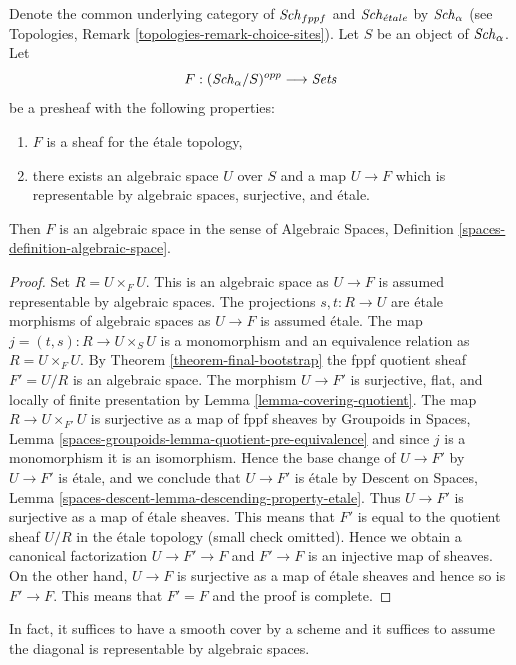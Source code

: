 \begin{lemma}
\label{lemma-spaces-etale-locally-representable}
Denote the common underlying category of $\mathit{Sch}_{fppf}$ and $\mathit{Sch}_{\acute{e}tale}$ by
$\mathit{Sch}_\alpha$ (see Topologies, Remark \ref{topologies-remark-choice-sites}).
Let $S$ be an object of $\mathit{Sch}_\alpha$. Let
$$
F : (\mathit{Sch}_\alpha/S)^{opp} \longrightarrow \textit{Sets}
$$
be a presheaf with the following properties:
\begin{enumerate}
\item $F$ is a sheaf for the \'etale topology,
\item there exists an algebraic space $U$ over $S$
and a map $U \to F$ which is representable by
algebraic spaces, surjective, and \'etale.
\end{enumerate}
Then $F$ is an algebraic space in the sense of
Algebraic Spaces, Definition \ref{spaces-definition-algebraic-space}.
\end{lemma}

\begin{proof}
Set $R = U \times_F U$. This is an algebraic space as $U \to F$ is assumed
representable by algebraic spaces. The projections $s, t : R \to U$ are
\'etale morphisms of algebraic spaces as $U \to F$ is assumed \'etale.
The map $j = (t, s) : R \to U \times_S U$ is a monomorphism and an
equivalence relation as $R = U \times_F U$. By
Theorem \ref{theorem-final-bootstrap}
the fppf quotient sheaf $F' = U/R$ is an algebraic space.
The morphism $U \to F'$ is surjective, flat, and locally of finite
presentation by Lemma \ref{lemma-covering-quotient}.
The map $R \to U \times_{F'} U$ is surjective as a map of fppf
sheaves by Groupoids in Spaces, Lemma
\ref{spaces-groupoids-lemma-quotient-pre-equivalence}
and since $j$ is a monomorphism it is an isomorphism.
Hence the base change of $U \to F'$ by $U \to F'$ is \'etale,
and we conclude that $U \to F'$ is \'etale by
Descent on Spaces, Lemma \ref{spaces-descent-lemma-descending-property-etale}.
Thus $U \to F'$ is surjective as a map of \'etale sheaves.
This means that $F'$ is equal to the quotient sheaf $U/R$
in the \'etale topology (small check omitted). Hence we obtain
a canonical factorization $U \to F' \to F$ and $F' \to F$ is an injective
map of sheaves. On the other hand, $U \to F$ is surjective as a map
of \'etale sheaves and hence so is $F' \to F$. This means that $F' = F$
and the proof is complete.
\end{proof}

\noindent
In fact, it suffices to have a smooth cover by a scheme and it suffices
to assume the diagonal is representable by algebraic spaces.

